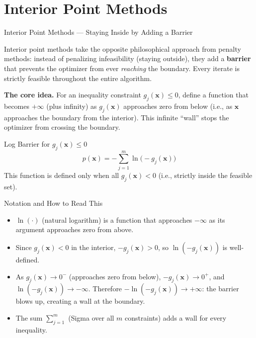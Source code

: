 \documentclass[aspectratio=169,10pt]{beamer}
\newcommand{\bx}{\mathbf{x}}
\begin{document}
\section{Interior Point Methods}

\begin{frame}[allowframebreaks]{Interior Point Methods --- Staying Inside by Adding a Barrier}

  Interior point methods take the opposite philosophical approach from penalty
  methods: instead of penalizing infeasibility (staying outside), they add a
  \textbf{barrier} that prevents the optimizer from ever \emph{reaching} the
  boundary.  Every iterate is strictly feasible throughout the entire algorithm.

  \textbf{The core idea.}  For an inequality constraint $g_j(\bx) \le 0$,
  define a function that becomes $+\infty$ (plus infinity) as $g_j(\bx)$
  approaches zero from below (i.e., as $\bx$ approaches the boundary from
  the interior).  This infinite ``wall'' stops the optimizer from crossing
  the boundary.

  \begin{block}{Log Barrier for $g_j(\bx) \le 0$}
    \[
      p(\bx) = -\sum_{j=1}^{m} \ln\!\bigl(-g_j(\bx)\bigr)
    \]
    This function is defined only when all $g_j(\bx) < 0$ (i.e., strictly
    inside the feasible set).
  \end{block}

  \begin{block}{Notation and How to Read This}
    \begin{itemize}
      \item $\ln(\cdot)$ (natural logarithm) is a function that approaches
            $-\infty$ as its argument approaches zero from above.
      \item Since $g_j(\bx) < 0$ in the interior, $-g_j(\bx) > 0$, so
            $\ln(-g_j(\bx))$ is well-defined.
      \item As $g_j(\bx) \to 0^-$ (approaches zero from below), $-g_j(\bx) \to 0^+$,
            and $\ln(-g_j(\bx)) \to -\infty$.  Therefore $-\ln(-g_j(\bx)) \to +\infty$:
            the barrier blows up, creating a wall at the boundary.
      \item The sum $\sum_{j=1}^m$ (Sigma over all $m$ constraints) adds a wall
            for every inequality.
    \end{itemize}
  \end{block}


\end{frame}
\end{document}
